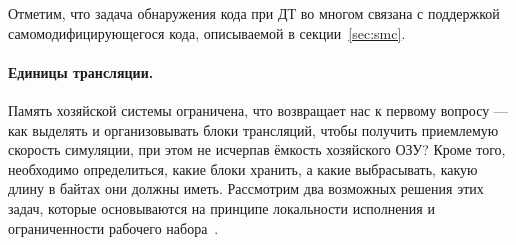 Отметим, что задача обнаружения кода при ДТ во многом связана с поддержкой самомодифицирующегося кода, описываемой в секции~\ref{sec:smc}.

\paragraph{Единицы трансляции.} Память хозяйской системы ограничена, что возвращает нас к первому вопросу — как выделять и организовывать блоки трансляций, чтобы  получить приемлемую скорость симуляции, при этом не исчерпав ёмкость хозяйского ОЗУ? Кроме того, необходимо определиться, какие блоки хранить, а какие выбрасывать, какую длину в байтах они должны иметь. Рассмотрим два возможных решения этих задач, которые основываются на принципе локальности исполнения и ограниченности рабочего набора~\cite{DBLP:books/daglib/0013597}.
 
